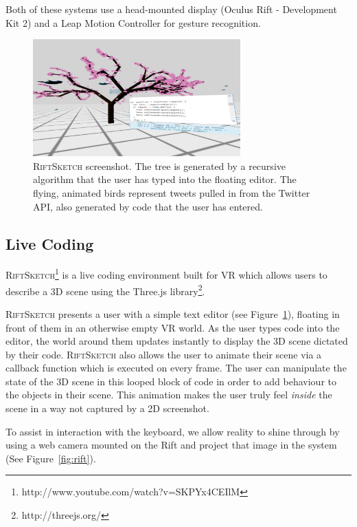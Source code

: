 \documentclass[conference]{IEEEtran}
\begin{document}
Both of these systems use a head-mounted display (Oculus Rift - Development Kit 2) and a Leap Motion Controller for gesture recognition.

\begin{figure}[ht!]
\centering
\includegraphics[width=80mm]{figures/riftsketch/unwarped_tree}
\caption{\textsc{RiftSketch} screenshot. The tree is generated by a recursive algorithm that the user has typed into the floating editor. The flying, animated birds represent tweets pulled in from the Twitter API, also generated by code that the user has entered. \label{fig:RiftSketch}}
\end{figure}

\subsection{Live Coding}

\textsc{RiftSketch}\footnote{http://www.youtube.com/watch?v=SKPYx4CEIlM} is a live coding environment built for VR which allows users to describe a 3D scene using the Three.js library\footnote{http://threejs.org/}.

\textsc{RiftSketch} presents a user with a simple text editor (see Figure~\ref{fig:RiftSketch}), floating in front of them in an otherwise empty VR world. 
As the user types code into the editor, the world around them updates instantly to display the 3D scene dictated by their code. 
\textsc{RiftSketch} also allows the user to animate their scene via a callback function which is executed on every frame. 
The user can manipulate the state of the 3D scene in this looped block of code in order to add behaviour to the objects in their scene.
This animation makes the user truly feel \emph{inside} the scene in a way not captured by a 2D screenshot.

To assist in interaction with the keyboard, we allow reality to shine through by using a web camera mounted on the Rift and project that image in the system (See Figure~\ref{fig:rift}).
\end{document}
